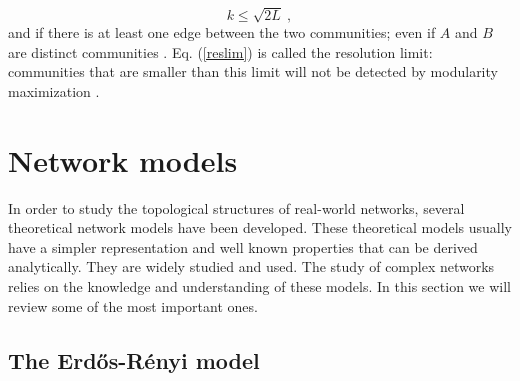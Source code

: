 \documentclass[11 pt , letterpaper , twoside , openright]{book}
\begin{document}
\begin{equation}\label{reslim}
	k \leqslant \sqrt{2L} \ ,
\end{equation}
and if there is at least one edge between the two communities; even if $A$ and $B$ are distinct communities \cite{Albert2016}. Eq. (\ref{reslim}) is called the resolution limit: communities that are smaller than this limit will not be detected by modularity maximization \cite{Albert2016}.

\section{Network models}
\label{netModel}

In order to study the topological structures of real-world networks, several theoretical network models have been developed. These theoretical models usually have a simpler representation and well known properties that can be derived analytically. They are widely studied and used. The study of complex networks relies on the knowledge and understanding of these models. In this section we will review some of the most important ones.

\subsection{The Erd\H{o}s-R\'{e}nyi model}
\end{document}
